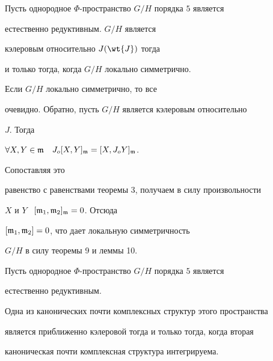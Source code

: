 \begin{lem}


Пусть однородное $\Phi$-пространство $G/H$ порядка $5$ является


естественно редуктивным. $G/H$ является 


кэлеровым относительно $J ( \wt{J})$ тогда


и только тогда, когда $G/H$ локально симметрично.


\end{lem}





\begin{pf}


Если $G/H$ локально симметрично, то все


очевидно. Обратно, пусть $G/H$ является кэлеровым относительно


$J$. Тогда


$\forall X,Y \in \frak{m}$ \ $J_o[X,Y]_{\frak{m}}=[X,J_oY]_{\frak{m}}$.


Сопоставляя это


равенство с равенствами теоремы 3, получаем в силу произвольности


$X$ и $Y$ \ $[\frak{m}_1,\frak{m}_2]_{\frak{m}}=0$. Отсюда


$[\frak{m}_1,\frak{m}_2]=0$, что дает локальную симметричность


$G/H$ в силу теоремы 9 и леммы 10.


\end{pf}





\begin{lem}


Пусть однородное $\Phi$-пространство $G/H$ порядка $5$ является


естественно редуктивным. 


Одна из канонических почти комплексных структур этого пространства 


является приближенно кэлеровой тогда и только тогда, когда вторая


каноническая почти комплексная структура интегрируема.


\end{lem}





